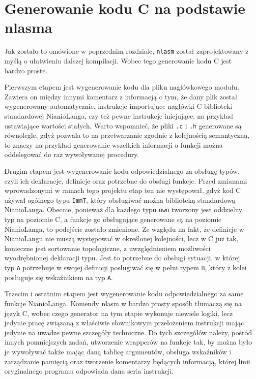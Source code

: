 \documentclass[licencjacka]{pracamgr}
\begin{document}
\section{Generowanie kodu C na podstawie nlasma}
Jak zostało to omówione w poprzednim rozdziale, \texttt{nlasm} został zaprojektowany z myślą o ułatwieniu dalszej kompilacji. Wobec tego generowanie
kodu C jest bardzo proste.


Pierwszym etapem jest wygenerowanie kodu dla pliku nagłówkowego modułu. Zawiera on między innymi komentarz z informacją o tym, że dany plik został
wygenerowany automatycznie, instrukcje importujące nagłówki C biblioteki standardowej NianioLanga, czy też pewne instrukcje inicjujące, na przykład
ustawiające wartości stałych. Warto wspomnieć, że pliki \texttt{.c} i \texttt{.h} generowane są równolegle, gdyż pozwala to na przetwarzanie zgodnie z
kolejnością semantyczną, to znaczy na przykład generowanie wszelkich informacji o funkcji można oddelegować do raz wywoływanej procedury.


Drugim etapem jest wygenerowanie kodu odpowiedzialnego za obsługę typów, czyli ich deklaracje, definicje oraz potrzebne do obsługi funkcje. Przed
zmianami wprowadzonymi w ramach tego projektu etap ten nie występował, gdyż kod C używał ogólnego typu \texttt{ImmT}, który obsługiwać można
biblioteką standardową NianioLanga. Obecnie, ponieważ dla każdego typu \texttt{own} tworzony jest oddzielny typ na poziomie C, a funkcje go
obsługujące generowane są na poziomie NianioLanga, to podejście zostało zmienione. Ze względu na fakt, że definicje w NianioLangu nie muszą występować
w określonej kolejności, lecz w C już tak, konieczne jest sortowanie topologiczne, z uwzględnieniem możliwości wyodrębnionej deklaracji typu. Jest to
potrzebne do obsługi sytuacji, w której typ \texttt{A} potrzebuje w swojej definicji posługiwać się w pełni typem \texttt{B}, który z kolei posługuje
się wskaźnikiem na typ \texttt{A}.


Trzecim i ostatnim etapem jest wygenerowanie kodu odpowiedzialnego za same funkcje NianioLanga. Komendy nlasm w bardzo prosty sposób tłumaczą się na
język C, wobec czego generator na tym etapie wykonuje niewiele logiki, lecz jedynie pracę związaną z właściwie słownikowym przełożeniem instrukcji
mając jedynie na uwadze pewne szczegóły techniczne. Do tych szczegółów należy, pośród innych pomniejszych zadań, utworzenie wrapperów na funkcje tak,
by można było je wywoływać także mając daną tablicę argumentów, obsługa wskaźników i zarządzanie pamięcią oraz tworzenie komentarzy będących
informacją, której linii oryginalnego programu odpowiada dana seria instrukcji.
\end{document}
